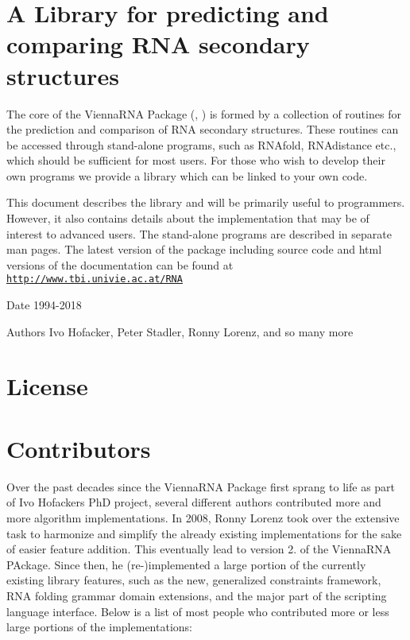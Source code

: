 \hypertarget{index_introduction}{}\section{A Library for predicting and comparing R\+N\+A secondary structures}\label{index_introduction}
The core of the Vienna\+R\+NA Package (\cite{lorenz:2011}, \cite{hofacker:1994}) is formed by a collection of routines for the prediction and comparison of R\+NA secondary structures. These routines can be accessed through stand-\/alone programs, such as {\ttfamily R\+N\+Afold}, {\ttfamily R\+N\+Adistance} etc., which should be sufficient for most users. For those who wish to develop their own programs we provide a library which can be linked to your own code.

This document describes the library and will be primarily useful to programmers. However, it also contains details about the implementation that may be of interest to advanced users. The stand-\/alone programs are described in separate man pages. The latest version of the package including source code and html versions of the documentation can be found at ~\newline
~\newline
 \href{http://www.tbi.univie.ac.at/RNA}{\tt http\+://www.\+tbi.\+univie.\+ac.\+at/\+R\+NA}

\begin{DoxyDate}{Date}
1994-\/2018 
\end{DoxyDate}
\begin{DoxyAuthor}{Authors}
Ivo Hofacker, Peter Stadler, Ronny Lorenz, and so many more
\end{DoxyAuthor}
\hypertarget{index_license}{}\section{License}\label{index_license}

\begin{DoxyVerbInclude}
\end{DoxyVerbInclude}
\hypertarget{index_contributors}{}\section{Contributors}\label{index_contributors}
Over the past decades since the {\ttfamily Vienna\+R\+NA Package} first sprang to life as part of Ivo Hofackers PhD project, several different authors contributed more and more algorithm implementations. In 2008, Ronny Lorenz took over the extensive task to harmonize and simplify the already existing implementations for the sake of easier feature addition. This eventually lead to version 2. of the {\ttfamily Vienna\+R\+NA P\+Ackage}. Since then, he (re-\/)implemented a large portion of the currently existing library features, such as the new, generalized constraints framework, R\+NA folding grammar domain extensions, and the major part of the scripting language interface. Below is a list of most people who contributed more or less large portions of the implementations\+:


